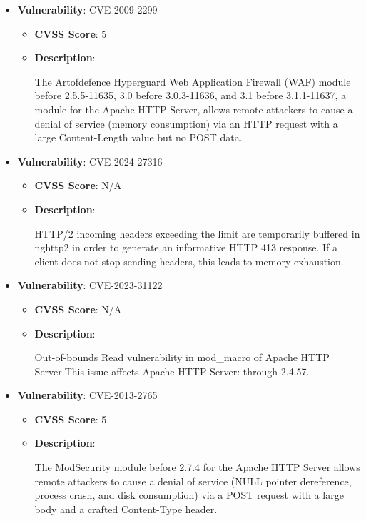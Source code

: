 \documentclass{article}
\begin{document}
\begin{itemize}
        \item \textbf{Vulnerability}: CVE-2009-2299
        \begin{itemize}
            \item \textbf{CVSS Score}:  5 
            \item \textbf{Description}:
            \parbox[t]{0.9\linewidth}{
                \ttfamily The Artofdefence Hyperguard Web Application Firewall (WAF) module before 2.5.5-11635, 3.0 before 3.0.3-11636, and 3.1 before 3.1.1-11637, a module for the Apache HTTP Server, allows remote attackers to cause a denial of service (memory consumption) via an HTTP request with a large Content-Length value but no POST data.
            }
        \end{itemize}
    
        \item \textbf{Vulnerability}: CVE-2024-27316
        \begin{itemize}
            \item \textbf{CVSS Score}:  N/A 
            \item \textbf{Description}:
            \parbox[t]{0.9\linewidth}{
                \ttfamily HTTP/2 incoming headers exceeding the limit are temporarily buffered in nghttp2 in order to generate an informative HTTP 413 response. If a client does not stop sending headers, this leads to memory exhaustion.
            }
        \end{itemize}
    
        \item \textbf{Vulnerability}: CVE-2023-31122
        \begin{itemize}
            \item \textbf{CVSS Score}:  N/A 
            \item \textbf{Description}:
            \parbox[t]{0.9\linewidth}{
                \ttfamily Out-of-bounds Read vulnerability in mod\_macro of Apache HTTP Server.This issue affects Apache HTTP Server: through 2.4.57.
            }
        \end{itemize}
    
        \item \textbf{Vulnerability}: CVE-2013-2765
        \begin{itemize}
            \item \textbf{CVSS Score}:  5 
            \item \textbf{Description}:
            \parbox[t]{0.9\linewidth}{
                \ttfamily The ModSecurity module before 2.7.4 for the Apache HTTP Server allows remote attackers to cause a denial of service (NULL pointer dereference, process crash, and disk consumption) via a POST request with a large body and a crafted Content-Type header.
            }
        \end{itemize}
    

\end{itemize}
\end{document}
